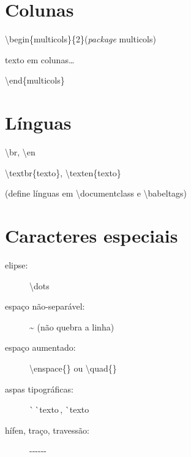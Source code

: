 \documentclass[11pt,twoside,english,brazil]{article}
\begin{document}
\begin{multicols}{3}
\section*{Colunas}

\textbackslash{}begin\{multicols\}\{2\}\quad (\textit{package} \textsf{multicols})

\quad texto em colunas\dots

\textbackslash{}end\{multicols\}

\columnbreak

\section*{Línguas}

\textbackslash{}br, \textbackslash{}en

\textbackslash{}textbr\{texto\}, \textbackslash{}texten\{texto\}

(define línguas em \textsf{\textbackslash{}documentclass} e \textsf{\textbackslash{}babeltags})

\section*{Caracteres especiais}

\begin{description}
  \item[elipse:] \textbackslash{}dots
  \item[espaço não-separável:] \textasciitilde{} (não quebra a linha)
  \item[espaço aumentado:] \textbackslash{}enspace\{\} ou \textbackslash{}quad\{\}
  \item[aspas tipográficas:] \`{ }\,\`{ }texto\textquotesingle\,\textquotesingle,
                \`{ }texto\textquotesingle
  \item[hífen, traço, travessão:] -\quad -\hspace{.7pt}-\quad -\hspace{.7pt}-\hspace{.7pt}-
\end{description}

\vspace{\baselineskip}


\end{multicols}
\end{document}
